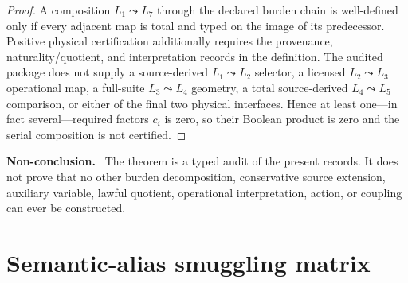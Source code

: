 \documentclass[11pt]{article}
\newenvironment{nonconclusion}{\par\smallskip\noindent\textbf{Non-conclusion.}\ }{\par\smallskip}
\begin{document}
\begin{proof}
A composition \(L_1\leadsto L_7\) through the declared burden chain is
well-defined only if every adjacent map is total and typed on the image of its
predecessor. Positive physical certification additionally requires the
provenance, naturality/quotient, and interpretation records in the definition.
The audited package does not supply a source-derived \(L_1\leadsto L_2\)
selector, a licensed \(L_2\leadsto L_3\) operational map, a full-suite
\(L_3\leadsto L_4\) geometry, a total source-derived
\(L_4\leadsto L_5\) comparison, or either of the final two physical
interfaces. Hence at least one---in fact several---required factors \(c_i\)
is zero, so their Boolean product is zero and the serial composition is not
certified.
\end{proof}

\begin{nonconclusion}
The theorem is a typed audit of the present records. It does not prove that no
other burden decomposition, conservative source extension, auxiliary
variable, lawful quotient, operational interpretation, action, or coupling
can ever be constructed.
\end{nonconclusion}

\section{Semantic-alias smuggling matrix}
\end{document}
